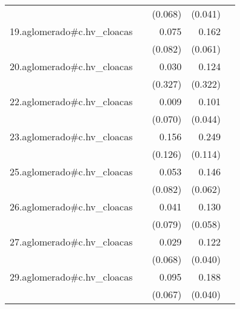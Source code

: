 {\begin{longtable}{l*{4}{D{.}{.}{-1}}}
            &                     &     (0.068)         &     (0.041)         &                     \\
\addlinespace
19.aglomerado#c.hv\_cloacas&                     &       0.075         &       0.162\sym{**} &                     \\
            &                     &     (0.082)         &     (0.061)         &                     \\
\addlinespace
20.aglomerado#c.hv\_cloacas&                     &       0.030         &       0.124         &                     \\
            &                     &     (0.327)         &     (0.322)         &                     \\
\addlinespace
22.aglomerado#c.hv\_cloacas&                     &       0.009         &       0.101\sym{*}  &                     \\
            &                     &     (0.070)         &     (0.044)         &                     \\
\addlinespace
23.aglomerado#c.hv\_cloacas&                     &       0.156         &       0.249\sym{*}  &                     \\
            &                     &     (0.126)         &     (0.114)         &                     \\
\addlinespace
25.aglomerado#c.hv\_cloacas&                     &       0.053         &       0.146\sym{*}  &                     \\
            &                     &     (0.082)         &     (0.062)         &                     \\
\addlinespace
26.aglomerado#c.hv\_cloacas&                     &       0.041         &       0.130\sym{*}  &                     \\
            &                     &     (0.079)         &     (0.058)         &                     \\
\addlinespace
27.aglomerado#c.hv\_cloacas&                     &       0.029         &       0.122\sym{**} &                     \\
            &                     &     (0.068)         &     (0.040)         &                     \\
\addlinespace
29.aglomerado#c.hv\_cloacas&                     &       0.095         &       0.188\sym{***}&                     \\
            &                     &     (0.067)         &     (0.040)         &                     \\

\end{longtable}}
